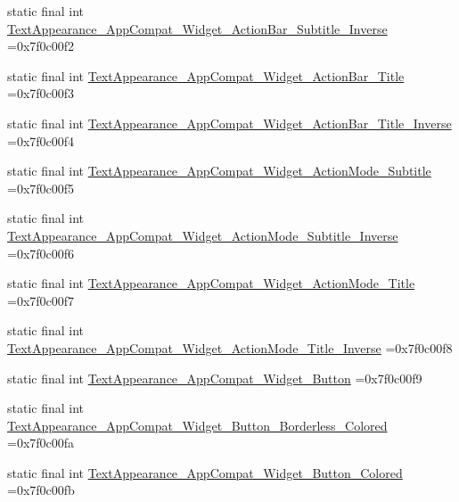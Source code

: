 \begin{DoxyCompactItemize}
static final int \mbox{\hyperlink{classbr_1_1unb_1_1cic_1_1mp_1_1marketmaster_1_1test_1_1R_1_1style_a629ceebbc134da331ac8dd7f1a17fe14}{Text\+Appearance\+\_\+\+App\+Compat\+\_\+\+Widget\+\_\+\+Action\+Bar\+\_\+\+Subtitle\+\_\+\+Inverse}} =0x7f0c00f2
\item 
static final int \mbox{\hyperlink{classbr_1_1unb_1_1cic_1_1mp_1_1marketmaster_1_1test_1_1R_1_1style_aed94ee92b3820ab5eab156560d54accd}{Text\+Appearance\+\_\+\+App\+Compat\+\_\+\+Widget\+\_\+\+Action\+Bar\+\_\+\+Title}} =0x7f0c00f3
\item 
static final int \mbox{\hyperlink{classbr_1_1unb_1_1cic_1_1mp_1_1marketmaster_1_1test_1_1R_1_1style_a83a6632e82b7f4f12b960ecf1aa8fe81}{Text\+Appearance\+\_\+\+App\+Compat\+\_\+\+Widget\+\_\+\+Action\+Bar\+\_\+\+Title\+\_\+\+Inverse}} =0x7f0c00f4
\item 
static final int \mbox{\hyperlink{classbr_1_1unb_1_1cic_1_1mp_1_1marketmaster_1_1test_1_1R_1_1style_afa627ea4da86105a97d8cfcaba505363}{Text\+Appearance\+\_\+\+App\+Compat\+\_\+\+Widget\+\_\+\+Action\+Mode\+\_\+\+Subtitle}} =0x7f0c00f5
\item 
static final int \mbox{\hyperlink{classbr_1_1unb_1_1cic_1_1mp_1_1marketmaster_1_1test_1_1R_1_1style_a54451620fe2b672051399dd4ae1cd212}{Text\+Appearance\+\_\+\+App\+Compat\+\_\+\+Widget\+\_\+\+Action\+Mode\+\_\+\+Subtitle\+\_\+\+Inverse}} =0x7f0c00f6
\item 
static final int \mbox{\hyperlink{classbr_1_1unb_1_1cic_1_1mp_1_1marketmaster_1_1test_1_1R_1_1style_a3da86a58afba5704bfd895fd6621d457}{Text\+Appearance\+\_\+\+App\+Compat\+\_\+\+Widget\+\_\+\+Action\+Mode\+\_\+\+Title}} =0x7f0c00f7
\item 
static final int \mbox{\hyperlink{classbr_1_1unb_1_1cic_1_1mp_1_1marketmaster_1_1test_1_1R_1_1style_abfccb645e5826e9ad8d5f1e9e59dba2d}{Text\+Appearance\+\_\+\+App\+Compat\+\_\+\+Widget\+\_\+\+Action\+Mode\+\_\+\+Title\+\_\+\+Inverse}} =0x7f0c00f8
\item 
static final int \mbox{\hyperlink{classbr_1_1unb_1_1cic_1_1mp_1_1marketmaster_1_1test_1_1R_1_1style_a8cf4a4069d0b3c2261dde2f69e4c7a69}{Text\+Appearance\+\_\+\+App\+Compat\+\_\+\+Widget\+\_\+\+Button}} =0x7f0c00f9
\item 
static final int \mbox{\hyperlink{classbr_1_1unb_1_1cic_1_1mp_1_1marketmaster_1_1test_1_1R_1_1style_a3612575e96f139e09271d0e03ebc2878}{Text\+Appearance\+\_\+\+App\+Compat\+\_\+\+Widget\+\_\+\+Button\+\_\+\+Borderless\+\_\+\+Colored}} =0x7f0c00fa
\item 
static final int \mbox{\hyperlink{classbr_1_1unb_1_1cic_1_1mp_1_1marketmaster_1_1test_1_1R_1_1style_a0a72122c774f44778b9f28c1a788395f}{Text\+Appearance\+\_\+\+App\+Compat\+\_\+\+Widget\+\_\+\+Button\+\_\+\+Colored}} =0x7f0c00fb

\end{DoxyCompactItemize}

